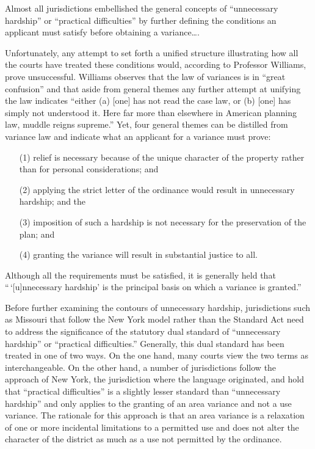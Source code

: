Almost all jurisdictions embellished the general concepts of ``unnecessary
hardship'' or ``practical difficulties'' by further defining the conditions an
applicant must satisfy before obtaining a variance\ldots .

Unfortunately, any attempt to set forth a unified structure illustrating how all
the courts have treated these conditions would, according to Professor Williams,
prove unsuccessful. Williams observes that the law of variances is in ``great
confusion'' and that aside from general themes any further attempt at unifying
the law indicates ``either (a) [one] has not read the case law, or (b) [one] has
simply not understood it. Here far more than elsewhere in American planning law,
muddle reigns supreme.'' Yet, four general themes can be distilled from variance
law and indicate what an applicant for a variance must prove:
\begin{itemize}
\item[(1)] relief is necessary because of the unique character of the property
rather than for personal considerations; and

\item[(2)] applying the strict letter of the ordinance would result in
unnecessary hardship; and the

\item[(3)] imposition of such a hardship is not necessary for the preservation
of the plan; and

\item[(4)] granting the variance will result in substantial justice to all.
\end{itemize}
Although all the requirements must be satisfied, it is generally held that
``\,`[u]nnecessary hardship' is the principal basis on which a variance is
granted.'' 

Before further examining the contours of unnecessary hardship, jurisdictions
such as Missouri that follow the New York model rather than the Standard Act
need to address the significance of the statutory dual standard of ``unnecessary
hardship'' or ``practical difficulties.'' Generally, this dual standard has been
treated in one of two ways. On the one hand, many courts view the two terms as
interchangeable. On the other hand, a number of jurisdictions follow the
approach of New York, the jurisdiction where the language originated, and hold
that ``practical difficulties'' is a slightly lesser standard than ``unnecessary
hardship'' and only applies to the granting of an area variance and not a use
variance. The rationale for this approach is that an area variance is a
relaxation of one or more incidental limitations to a permitted use and does not
alter the character of the district as much as a use not permitted by the
ordinance.

